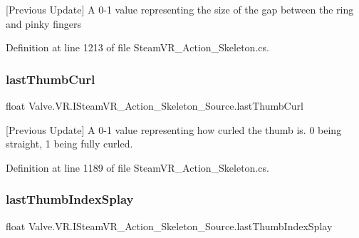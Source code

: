 \mbox{[}Previous Update\mbox{]} A 0-\/1 value representing the size of the gap between the ring and pinky fingers 



Definition at line 1213 of file Steam\+V\+R\+\_\+\+Action\+\_\+\+Skeleton.\+cs.

\mbox{\label{interface_valve_1_1_v_r_1_1_i_steam_v_r___action___skeleton___source_a56213cbee5496236ba17b0b552740f2c}} 
\subsubsection{\texorpdfstring{lastThumbCurl}{lastThumbCurl}}
{\footnotesize\ttfamily float Valve.\+V\+R.\+I\+Steam\+V\+R\+\_\+\+Action\+\_\+\+Skeleton\+\_\+\+Source.\+last\+Thumb\+Curl\hspace{0.3cm}{\ttfamily [get]}}



\mbox{[}Previous Update\mbox{]} A 0-\/1 value representing how curled the thumb is. 0 being straight, 1 being fully curled. 



Definition at line 1189 of file Steam\+V\+R\+\_\+\+Action\+\_\+\+Skeleton.\+cs.

\mbox{\label{interface_valve_1_1_v_r_1_1_i_steam_v_r___action___skeleton___source_a780dafd4acd62b8cb84cce5593bb09de}} 
\subsubsection{\texorpdfstring{lastThumbIndexSplay}{lastThumbIndexSplay}}
{\footnotesize\ttfamily float Valve.\+V\+R.\+I\+Steam\+V\+R\+\_\+\+Action\+\_\+\+Skeleton\+\_\+\+Source.\+last\+Thumb\+Index\+Splay\hspace{0.3cm}{\ttfamily [get]}}




